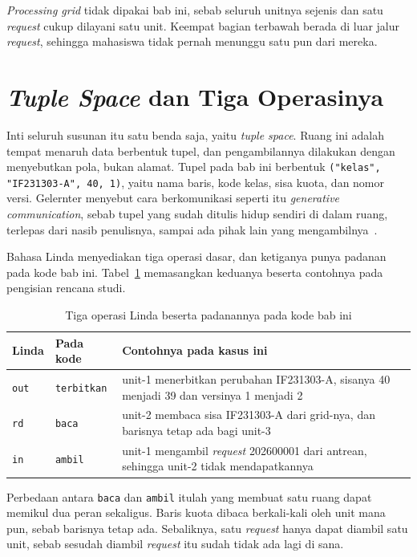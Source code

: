 \textit{Processing grid} tidak dipakai
bab ini, sebab seluruh unitnya sejenis
dan satu \textit{request} cukup dilayani satu unit. Keempat bagian terbawah
berada di luar jalur \textit{request}, sehingga mahasiswa tidak pernah menunggu
satu pun dari mereka.

\section{\textit{Tuple Space} dan Tiga Operasinya}

Inti seluruh susunan itu satu benda saja, yaitu \textit{tuple space}. Ruang ini
adalah tempat menaruh data berbentuk tupel, dan pengambilannya dilakukan dengan
menyebutkan pola, bukan alamat. Tupel pada bab ini berbentuk
\texttt{("kelas", "IF231303-A", 40, 1)}, yaitu nama baris, kode kelas, sisa
kuota, dan nomor versi. Gelernter menyebut cara berkomunikasi seperti itu
\textit{generative communication}, sebab tupel yang sudah ditulis hidup sendiri
di dalam ruang, terlepas dari nasib penulisnya, sampai ada pihak lain yang
mengambilnya~\cite{gelernter1985linda}.

Bahasa Linda menyediakan tiga operasi dasar, dan ketiganya punya padanan pada
kode bab ini. Tabel~\ref{tab:operasi-linda} memasangkan keduanya beserta
contohnya pada pengisian rencana studi.

\begin{table}[htbp]
  \centering
  \caption{Tiga operasi Linda beserta padanannya pada kode bab ini}
  \label{tab:operasi-linda}
  \begin{tabularx}{\textwidth}{|l|l|X|}
    \hline
    \textbf{Linda} & \textbf{Pada kode} & \textbf{Contohnya pada kasus ini} \\
    \hline
    \texttt{out} & \texttt{terbitkan} & unit-1 menerbitkan perubahan IF231303-A, sisanya 40 menjadi 39 dan versinya 1 menjadi 2 \\
    \hline
    \texttt{rd} & \texttt{baca} & unit-2 membaca sisa IF231303-A dari grid-nya, dan barisnya tetap ada bagi unit-3 \\
    \hline
    \texttt{in} & \texttt{ambil} & unit-1 mengambil \textit{request} 202600001 dari antrean, sehingga unit-2 tidak mendapatkannya \\
    \hline
  \end{tabularx}
\end{table}

Perbedaan antara \texttt{baca} dan \texttt{ambil} itulah yang membuat satu
ruang dapat memikul dua peran sekaligus. Baris kuota dibaca berkali-kali oleh
unit mana pun, sebab barisnya tetap ada. Sebaliknya, satu \textit{request}
hanya dapat diambil satu unit, sebab sesudah diambil \textit{request} itu sudah
tidak ada lagi di sana.

